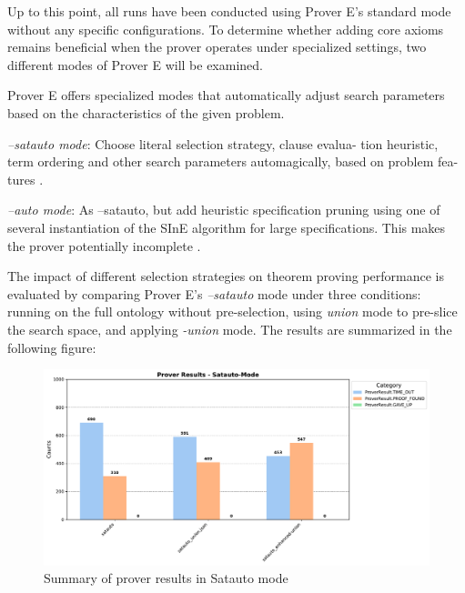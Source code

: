 \documentclass[english,version-2020-11]{uzl-thesis}
\begin{document}
Up to this point, all runs have been conducted using Prover E's standard mode without any specific configurations. To determine whether adding core axioms remains beneficial when the prover operates under specialized settings, two different modes of Prover E will be examined.

Prover E offers specialized modes that automatically adjust search parameters based on the characteristics of the given problem.

\begin{definition}
    \textit{--satauto mode}: Choose literal selection strategy, clause evalua-
    tion heuristic, term ordering and other search
    parameters automagically, based on problem fea-
    tures \cite{schulz2019eprover}.
\end{definition}

\begin{definition}
    \textit{--auto mode}: As --satauto, but add heuristic specification
    pruning using one of several instantiation of the
    SInE algorithm for large specifications.
    This makes the prover potentially incomplete \cite{schulz2019eprover}.
\end{definition}


The impact of different selection strategies on theorem proving performance is evaluated by comparing Prover E's \textit{--satauto} mode under three conditions: running on the full ontology without pre-selection, using \textit{union} mode to pre-slice the search space, and applying \textit{-union} mode. The results are summarized in the following figure:

\begin{figure}[h!]
    \centering
    \includegraphics[width=\textwidth]{satauto_mode_output.pdf}
    \caption{Summary of prover results in Satauto mode}
    \label{fig:prover_results_satauto}
\end{figure}
\FloatBarrier
\end{document}
